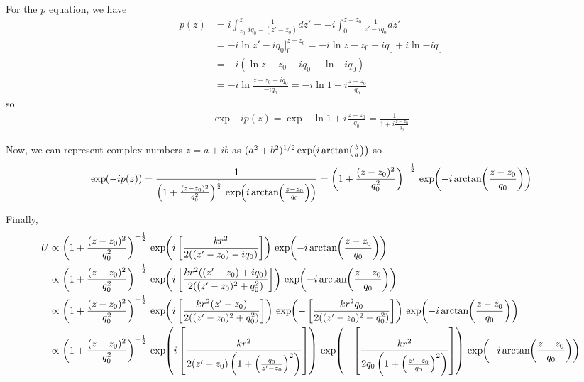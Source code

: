 For the $p$ equation, we have
\begin{equation}
   \begin{split}
       p(z) &= i \int_{z_0}^{z} \frac{1}{i q_0 - (z'-z_0)} dz'= -i \int_{0}^{z-z_0} \frac{1}{ z' - i q_0} dz' \\
       &= -i \ln{z' - i q_0}|_{0}^{z-z_0} = -i \ln{z - z_0 - i q_0} + i \ln{- i q_0}\\
       &= -i \left(\ln{z - z_0 - i q_0} - \ln{- i q_0}\right)\\
       &= -i \ln{\frac{z - z_0 - i q_0}{- i q_0}} = -i \ln{1 + i \frac{z - z_0}{q_0}}
   \end{split}
\end{equation}
so
\begin{equation}
   \begin{split}
       \exp{-i p(z)} = \exp{- \ln{1 + i \frac{z - z_0}{q_0}}}  = \frac{1}{1 + i \frac{z - z_0}{q_0}}
   \end{split}
\end{equation}

Now, we can represent complex numbers $z = a+ib$ as $(a^2+b^2)^{1/2}\exp{i \atan{\frac{b}{a}} }$ so 
\begin{equation}
   \begin{split}
       \exp{-i p(z)} = \frac{1}{\left(1 + \frac{(z - z_0)^2}{q_0^2}\right)^\frac{1}{2} \exp{i \atan{ \frac{z - z_0}{q_0} } }} = \left(1 + \frac{(z - z_0)^2}{q_0^2}\right)^{-\frac{1}{2}} \exp{-i \atan{ \frac{z - z_0}{q_0} } }
   \end{split} 
\end{equation}

Finally,
\begin{equation}
\begin{split}
   U  &\propto \left(1 + \frac{(z - z_0)^2}{q_0^2}\right)^{-\frac{1}{2}} \exp{i\left[ \frac{k r^2}{2 ((z'-z_0) - i q_0)} \right]} \exp{-i \atan{ \frac{z - z_0}{q_0} } } \\
   &\propto \left(1 + \frac{(z - z_0)^2}{q_0^2}\right)^{-\frac{1}{2}} \exp{i\left[ \frac{k r^2((z'-z_0) + i q_0)}{2 ((z'-z_0)^2 + q_0^2)} \right]} \exp{-i \atan{ \frac{z - z_0}{q_0} } } \\
   &\propto \left(1 + \frac{(z - z_0)^2}{q_0^2}\right)^{-\frac{1}{2}} \exp{i\left[ \frac{k r^2(z'-z_0)}{2 ((z'-z_0)^2 + q_0^2)} \right]} \exp{-\left[ \frac{k r^2 q_0}{2 ((z'-z_0)^2 + q_0^2)} \right]} \exp{-i \atan{ \frac{z - z_0}{q_0} } }\\
   &\propto \left(1 + \frac{(z - z_0)^2}{q_0^2}\right)^{-\frac{1}{2}} \exp{i\left[ \frac{k r^2}{2 (z'-z_0)\left(1 + \left(\frac{q_0}{z'-z_0}\right)^2\right)} \right]} \exp{-\left[ \frac{k r^2}{2q_0\left(1+\left(\frac{z'-z_0}{q_0}\right)^2\right)} \right]} \exp{-i \atan{ \frac{z - z_0}{q_0} } }\\
\end{split}
\end{equation}

